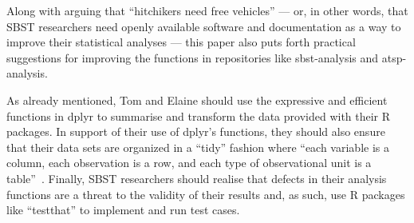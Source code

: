 



Along with arguing that ``hitchikers need free vehicles'' --- or, in other words, that SBST researchers need openly
available software and documentation as a way to improve their statistical analyses --- this paper also puts forth
practical suggestions for improving the functions in repositories like sbst-analysis and atsp-analysis.


As already mentioned, Tom and Elaine should use the expressive and efficient functions in dplyr to summarise and
transform the data provided with their R packages. In support of their use of dplyr's functions, they should also ensure
that their data sets are organized in a ``tidy'' fashion where ``each variable is a column, each observation is a row,
and each type of observational unit is a table''~\cite{Wickham2014}.  Finally, SBST researchers should realise that
defects in their analysis functions are a threat to the validity of their results and, as such, use R packages
like ``testthat'' to implement and run test cases.




